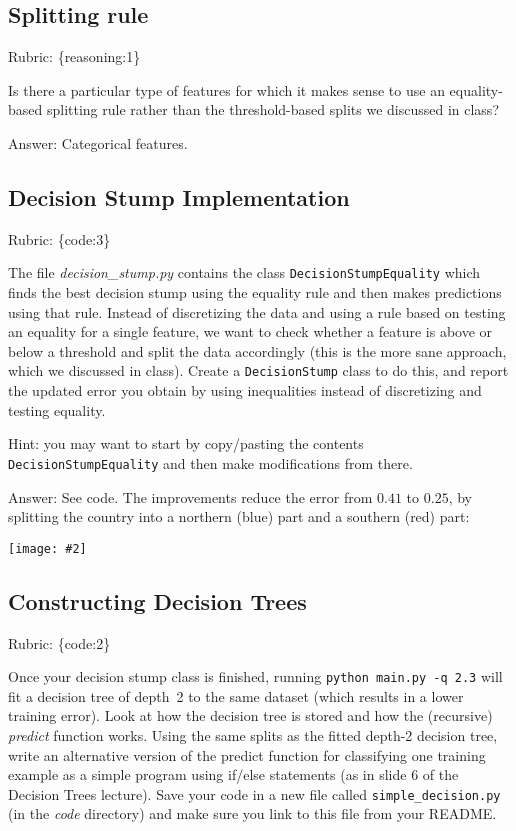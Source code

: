 \documentclass{article}
\def\ans#1{\par\gre{Answer: #1}}
\def\answer#1{\ans{#1}}
\def\rubric#1{\gre{Rubric: \{#1\}}}{}
\def\blu#1{{\color{blu}#1}}
\def\gre#1{{\color{gre}#1}}
\newcommand{\centerfig}[2]{\begin{center}\texttt{[image: \#2]}\end{center}}
\begin{document}
\subsection{Splitting rule}
\rubric{reasoning:1}

Is there a particular type of features for which it makes sense to use an equality-based splitting rule rather than the threshold-based splits we discussed in class?

\answer{Categorical features.}

\subsection{Decision Stump Implementation}
\rubric{code:3}

The file \emph{decision\_stump.py} contains the class \texttt{DecisionStumpEquality} which finds the best decision stump using the equality rule and then makes predictions using that rule. Instead of discretizing the data and using a rule based on testing an equality for a single feature, we want to check whether a feature is above or below a threshold and split the data accordingly (this is the more sane approach, which we discussed in class). \blu{Create a \texttt{DecisionStump} class to do this, and report the updated error you obtain by using inequalities instead of discretizing and testing equality.}

Hint: you may want to start by copy/pasting the contents \texttt{DecisionStumpEquality} and then make modifications from there. %

\answer{
% 
See code.
The improvements reduce the error from $0.41$ to $0.25$, by splitting the country into a northern (blue) part and a southern (red) part:\\
\centerfig{.45}{../figs/q2_2_decisionBoundary}
}

\subsection{Constructing Decision Trees}
\rubric{code:2}

Once your decision stump class is finished, running \texttt{python main.py -q 2.3} will fit
a decision tree of depth~2 to the same dataset (which results in a lower training error).
Look at how the decision tree is stored and how the (recursive) \emph{predict} function works.
\blu{Using the same splits as the fitted depth-2 decision tree, write an alternative version of the predict
function for classifying one training example as a simple program using if/else statements
(as in slide 6 of the Decision Trees lecture).} Save your code in a new file called
\texttt{simple\string_decision.py} (in the \emph{code} directory) and make sure you link to this file from your README.
\end{document}
